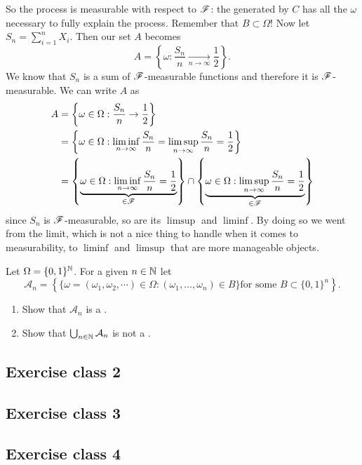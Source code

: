 \documentclass{report}
\begin{document}
So the process is measurable with respect to $\mathscr{F}$: the \sa{} generated by $C$ has all the $\omega$ necessary to fully explain the process. Remember that $B\subset\Omega$! Now let $S_n=\sum_{i=1}^{n}X_i$. Then our set $A$ becomes
\begin{equation*}
	A=\left\{\omega:\frac{S_n}{n}\xrightarrow[n\to\infty]{}\frac{1}{2}\right\}.
\end{equation*}We know that $S_n$ is a sum of $\mathscr{F}$-measurable functions and therefore it is $\mathscr{F}$-measurable. We can write $A$ as
\begin{align*}
	A&=\left\{\omega\in\Omega:\frac{S_n}{n}\to\frac{1}{2}\right\}\\
	&=\left\{\omega\in\Omega:\liminf_{n \to \infty}\frac{S_n}{n}=\limsup_{n\to\infty}\frac{S_n}{n}=\frac{1}{2}\right\}\\
	&=\left\{\underbrace{\omega\in\Omega:\liminf_{n \to \infty}\frac{S_n}{n}=\frac{1}{2}}_{\in\mathscr{F}}\right\}\cap\left\{\underbrace{\omega\in\Omega:\limsup_{n \to \infty}\frac{S_n}{n}=\frac{1}{2}}_{\in\mathscr{F}}\right\}
\end{align*}
since $S_n$ is $\mathscr{F}$-measurable, so are its $\limsup$ and $\liminf$. By doing so we went from the limit, which is not a nice thing to handle when it comes to measurability, to $\liminf$ and $\limsup$ that are more manageable objects.
\begin{exercise}
	Let $\Omega=\{0,1\}^{\mathbb{N}}$. For a given $n\in\mathbb{N}$ let 
	\begin{equation*}
		\mathcal{A}_n=\left\{\{\omega=(\omega_1,\omega_2,\cdots)\in\Omega:(\omega_1,\ldots,\omega_n)\in B\}\text{for some }B\subset\{0,1\}^{n}\right\}.
	\end{equation*}
	\begin{enumerate}[\circnum]
		\item Show that $\mathcal{A}_n$ is a \sa.
		\item Show that $\bigcup_{n\in\mathbb{N}}\mathcal{A}_{n}$ is not a \sa.
	\end{enumerate}
\end{exercise}
\subsection{Exercise class 2}
\subsection{Exercise class 3}
\subsection{Exercise class 4}
\end{document}
